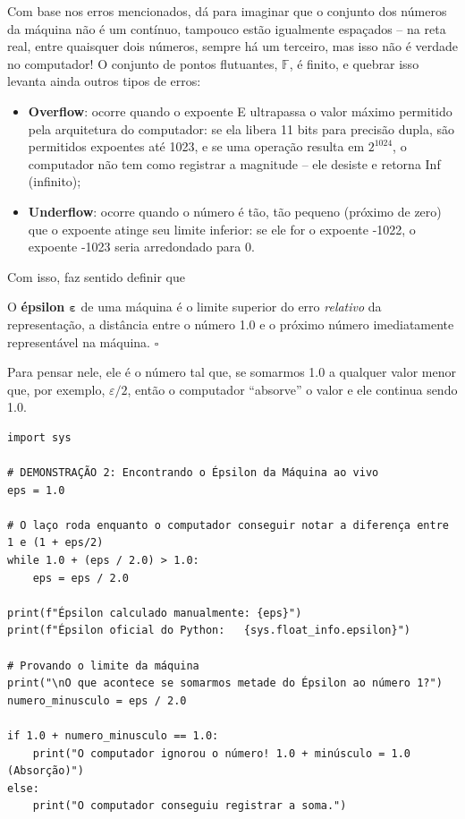 \documentclass[../numerical_methods.tex]{subfiles}
\begin{document}
Com base nos erros mencionados, dá para imaginar que o conjunto dos números da máquina não é um contínuo, tampouco estão igualmente espaçados -- na reta real, entre quaisquer dois números, sempre há um terceiro, mas isso não é verdade no computador! O conjunto de pontos flutuantes, \(\mathbb{F}\), é finito, e quebrar isso levanta ainda outros tipos de erros:
\begin{itemize}
	\item \textbf{Overflow}: ocorre quando o expoente E ultrapassa o valor máximo permitido pela arquitetura do computador: se ela libera 11 bits para precisão dupla, são permitidos expoentes até 1023, e se uma operação resulta em \(2^{1024}\), o computador não tem como registrar a magnitude -- ele desiste e retorna Inf (infinito);
	\item \textbf{Underflow}: ocorre quando o número é tão, tão pequeno (próximo de zero) que o expoente atinge seu limite inferior: se ele for o expoente -1022, o expoente -1023 seria arredondado para 0.
\end{itemize}
Com isso, faz sentido definir que
\begin{def*}
	O \textbf{épsilon \(\mathbf{\varepsilon }\)} de uma máquina é o limite superior do erro \textit{relativo} da representação, a distância entre o número 1.0 e o próximo número imediatamente representável na máquina. \(\square\)
\end{def*}
Para pensar nele, ele é o número tal que, se somarmos 1.0 a qualquer valor menor que, por exemplo, \(\varepsilon/2\), então o computador ``absorve'' o valor e ele continua sendo 1.0.

\begin{listing}[H]
	\begin{verbatim}
import sys

# DEMONSTRAÇÃO 2: Encontrando o Épsilon da Máquina ao vivo
eps = 1.0

# O laço roda enquanto o computador conseguir notar a diferença entre 1 e (1 + eps/2)
while 1.0 + (eps / 2.0) > 1.0:
    eps = eps / 2.0

print(f"Épsilon calculado manualmente: {eps}")
print(f"Épsilon oficial do Python:   {sys.float_info.epsilon}")

# Provando o limite da máquina
print("\nO que acontece se somarmos metade do Épsilon ao número 1?")
numero_minusculo = eps / 2.0

if 1.0 + numero_minusculo == 1.0:
    print("O computador ignorou o número! 1.0 + minúsculo = 1.0 (Absorção)")
else:
    print("O computador conseguiu registrar a soma.")
\end{verbatim}
\end{listing}
\end{document}
